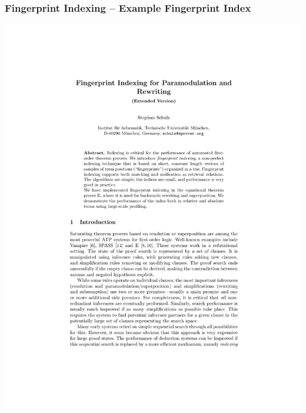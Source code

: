 \documentclass[10pt]{beamer}
\begin{document}
\begin{frame}
  \frametitle{Fingerprint Indexing -- Example Fingerprint Index}
  \includegraphics[page=7,scale=0.7,trim=4cm 13.5cm 5cm 4.5cm,clip]{schulz_fp-index_ext}
\end{frame}
\end{document}
